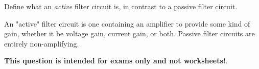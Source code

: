 

Define what an {\it active} filter circuit is, in contrast to a passive filter circuit.







An "active" filter circuit is one containing an amplifier to provide some kind of gain, whether it be voltage gain, current gain, or both.  Passive filter circuits are entirely non-amplifying.







{\bf This question is intended for exams only and not worksheets!}.



